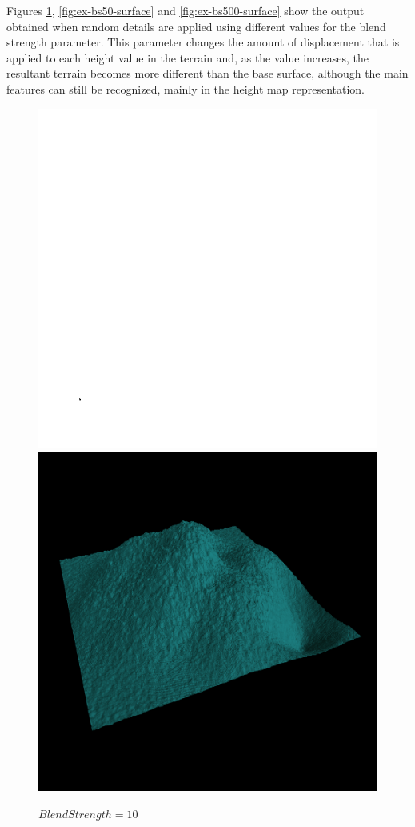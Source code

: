 	Figures \ref{fig:ex-bs10-surface}, \ref{fig:ex-bs50-surface} and \ref{fig:ex-bs500-surface} show the output obtained when random details are applied using different values for the blend strength parameter. This parameter changes the amount of displacement that is applied to each height value in the terrain and, as the value increases, the resultant terrain becomes more different than the base surface, although the main features can still be recognized, mainly in the height map representation.
	
	\begin{figure}[H]
	  \centering
	  \includegraphics[width=\imagewidth]{images/results/terrains/512-1/blending/bs_10}
	  \includegraphics[width=\imagewidth]{images/results/terrains/512-1/blending/bs_10_3d}
	  \caption{$BlendStrength = 10$}
	  \label{fig:ex-bs10-surface}
	\end{figure}
	
